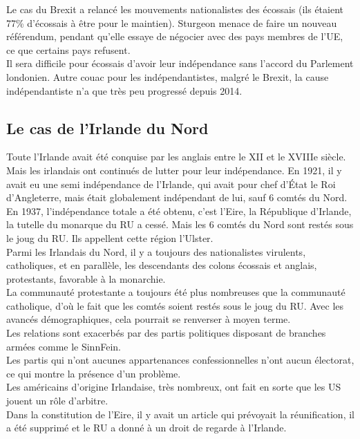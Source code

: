 \documentclass[10pt, a4paper, openany]{book}
\begin{document}
Le cas du Brexit a relancé les mouvements nationalistes des écossais (ils étaient 77\% d'écossais à être pour le maintien). Sturgeon menace de faire un nouveau référendum, pendant qu'elle essaye de négocier avec des pays membres de l'UE, ce que certains pays refusent. \\
Il sera difficile pour écossais d'avoir leur indépendance sans l'accord du Parlement londonien. Autre couac pour les indépendantistes, malgré le Brexit, la cause indépendantiste n'a que très peu progressé depuis 2014. 

\subsection{Le cas de l'Irlande du Nord}

Toute l'Irlande avait été conquise par les anglais entre le XII et le XVIIIe siècle. Mais les irlandais ont continués de lutter pour leur indépendance. En 1921, il y avait eu une semi indépendance de l'Irlande, qui avait pour chef d'État le Roi d'Angleterre, mais était globalement indépendant de lui, sauf 6 comtés du Nord. \\
En 1937, l'indépendance totale a été obtenu, c'est l'Eire, la République d'Irlande, la tutelle du monarque du RU a cessé. Mais les 6 comtés du Nord sont restés sous le joug du RU. Ils appellent cette région l'Ulster. \\
Parmi les Irlandais du Nord, il y a toujours des nationalistes virulents, catholiques, et en parallèle, les descendants des colons écossais et anglais, protestants, favorable à la monarchie. \\
La communauté protestante a toujours été plus nombreuses que la communauté catholique, d'où le fait que les comtés soient restés sous le joug du RU. Avec les avancés démographiques, cela pourrait se renverser à moyen terme. \\
Les relations sont exacerbés par des partis politiques disposant de branches armées comme le SinnFein. \\
Les partis qui n'ont aucunes appartenances confessionnelles n'ont aucun électorat, ce qui montre la présence d'un problème. \\
Les américains d'origine Irlandaise, très nombreux, ont fait en sorte que les US jouent un rôle d'arbitre. \\
Dans la constitution de l'Eire, il y avait un article qui prévoyait la réunification, il a été supprimé et le RU a donné à un droit de regarde à l'Irlande.
\end{document}
